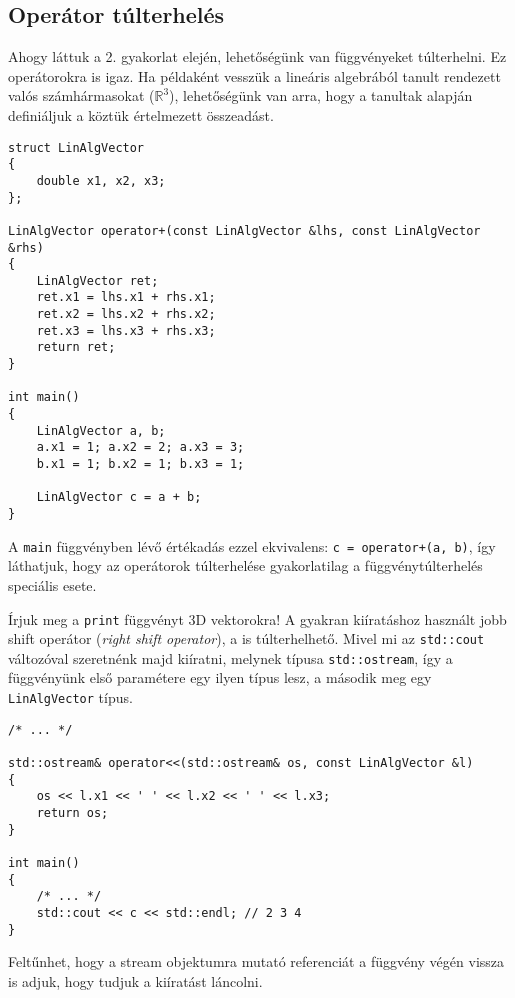 \documentclass[a4paper,11.5pt,table]{article}
\begin{document}
	\subsection{Operátor túlterhelés}
	Ahogy láttuk a 2. gyakorlat elején, lehetőségünk van függvényeket túlterhelni. Ez operátorokra is igaz. Ha példaként vesszük a lineáris algebrából tanult rendezett valós számhármasokat ($\mathbb{R}^3$), lehetőségünk van arra, hogy a tanultak alapján definiáljuk a köztük értelmezett összeadást.
	\begin{lstlisting}
struct LinAlgVector
{
	double x1, x2, x3;
};

LinAlgVector operator+(const LinAlgVector &lhs, const LinAlgVector &rhs)
{
	LinAlgVector ret;
	ret.x1 = lhs.x1 + rhs.x1;
	ret.x2 = lhs.x2 + rhs.x2; 
	ret.x3 = lhs.x3 + rhs.x3;
	return ret;
}

int main()
{
	LinAlgVector a, b;
	a.x1 = 1; a.x2 = 2; a.x3 = 3;
	b.x1 = 1; b.x2 = 1; b.x3 = 1;
	
	LinAlgVector c = a + b; 
}
	\end{lstlisting}
	A \texttt{main} függvényben lévő értékadás ezzel ekvivalens: \texttt{c = operator+(a, b)}, így láthatjuk, hogy az operátorok túlterhelése gyakorlatilag a függvénytúlterhelés speciális esete. 
	\smallskip 
	
	Írjuk meg a \texttt{print} függvényt 3D vektorokra! A gyakran kiíratáshoz használt jobb shift operátor (\textit{right shift operator}), a \texttt{\<} is túlterhelhető. Mivel mi az \texttt{std::cout} változóval szeretnénk majd kiíratni, melynek típusa \texttt{std::ostream}, így a függvényünk első paramétere egy ilyen típus lesz, a második meg egy \texttt{LinAlgVector} típus.
	
	\begin{lstlisting}
/* ... */

std::ostream& operator<<(std::ostream& os, const LinAlgVector &l)
{
	os << l.x1 << ' ' << l.x2 << ' ' << l.x3;
	return os;
}

int main()
{
	/* ... */
	std::cout << c << std::endl; // 2 3 4
}
	\end{lstlisting}
	
	Feltűnhet, hogy a stream objektumra mutató referenciát a függvény végén vissza is adjuk, hogy tudjuk a kiíratást láncolni.
\end{document}

